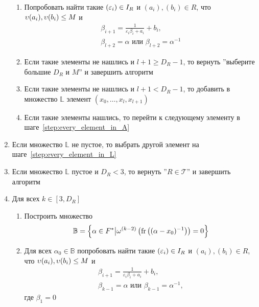 \documentclass[_00_autoref.tex]{subfiles}
\begin{document}
\begin{algorithm}
\begin{enumerate}
\begin{enumerate}
            \item Попробовать найти такие $(\varepsilon_i) \in I_{R}$ и $(a_i), (b_i) \in R$, что $\upsilon(a_i),\upsilon(b_i) \le M$ и
            \begin{equation*}
                \begin{split}
                    \beta_{i+1}=\frac{1}{\varepsilon_i \beta_i + a_i} + b_i,\\
                    \beta_{l+2}=\alpha \textrm{ или } \beta_{l+2}=\alpha^{-1}
                \end{split}
            \end{equation*}

            \item Если такие элементы не нашлись и $l+1 \ge D_R - 1$, то вернуть ''выберите большие $D_R$ и $M$'' и завершить алгоритм
            
            \item Если такие элементы не нашлись и $l+1 < D_R - 1$, то добавить в множество $\mathbb{L}$ элемент $(x_0,\ldots,x_l,x_{l+1})$
            
            \item Если такие элементы нашлись, то перейти к следующему элементу в шаге~\ref{step:every_element_in_A}
        \end{enumerate}

        \item Если множество $\mathbb{L}$ не пустое, то выбрать другой элемент на шаге~\ref{step:every_element_in_L}
        
        \item Если множество $\mathbb{L}$ пустое и $D_R < 3$, то вернуть ''$R \in \mathcal{T}$'' и завершить алгоритм
        
        \item Для всех $k \in [3, D_R]$
        \begin{enumerate}
            \item Построить множество
            \begin{equation*}
                \mathbb{B} = \left\{
                    \alpha \in F^{*} \big| \omega^{(k-2)}\left(
                        \textrm{fr}\left((\alpha-x_0)^{-1}\right)
                    \right) = 0
                \right\}
            \end{equation*}

            \item Для всех $\alpha_0 \in \mathbb{B}$ попробовать найти такие $(\varepsilon_i) \in I_{R}$ и $(a_i), (b_i) \in R$, что $\upsilon(a_i), \upsilon(b_i) \le M$ и
            \begin{equation*}
                \begin{split}
                    \beta_{i+1}=\frac{1}{\varepsilon_i \beta_i + a_i} + b_i,\\
                    \beta_{k-1}=\alpha \textrm{ или } \beta_{k-1}=\alpha^{-1},
                \end{split}
            \end{equation*}
            где $\beta_1 = 0$


\end{enumerate}
\end{enumerate}
\end{algorithm}
\end{document}
